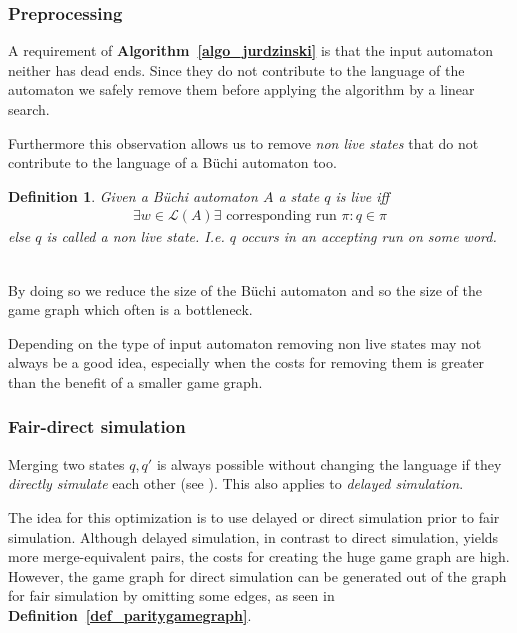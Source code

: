 \documentclass[12pt,oneside,bibliography=totoc,abstracton]{scrartcl}
\newcommand{\algoref}[1]{\textbf{Algorithm~\ref{#1}}}
\newcommand{\defref}[1]{\textbf{Definition~\ref{#1}}}
\newcommand{\libref}[1]{\textbf{\cite{#1}}}
\newtheorem{mydef}{Definition}
\begin{document}
\subsubsection*{Preprocessing}
A requirement of \algoref{algo_jurdzinski} is that the input automaton neither has dead ends.
Since they do not contribute to the language of the automaton we safely remove them before
applying the algorithm by a linear search.

Furthermore this observation allows us to remove \textit{non live states} \libref{livestates} that do not contribute to the
language of a Büchi automaton too.
\begin{mydef}
	Given a Büchi automaton $A$ a state $q$ is \textnormal{live} iff
	\begin{align*}
		\exists w \in \mathcal{L}(A) \exists \text{ corresponding run } \pi : q \in \pi
	\end{align*}
	else $q$ is called a \textnormal{non live state}. I.e. $q$ occurs in an accepting run on some word.
\end{mydef}\quad\\
By doing so we reduce the size of the Büchi automaton and so the size of the game graph which often is a bottleneck.

Depending on the type of input automaton removing non live states may not always be a good idea, especially
when the costs for removing them is greater than the benefit of a smaller game graph.

\subsubsection*{Fair-direct simulation}
Merging two states $q, q'$ is always possible without changing the language if they \textit{directly simulate}
each other (see \libref{simulation_general}). This also applies to \textit{delayed simulation}.

The idea for this optimization is to use delayed or direct simulation prior to fair simulation. Although delayed simulation,
in contrast to direct simulation, yields more merge-equivalent pairs, the costs for creating the huge game graph are high.
However, the game graph for direct simulation can be generated out of the graph for fair simulation
by omitting some edges, as seen in \defref{def_paritygamegraph}.
\end{document}
